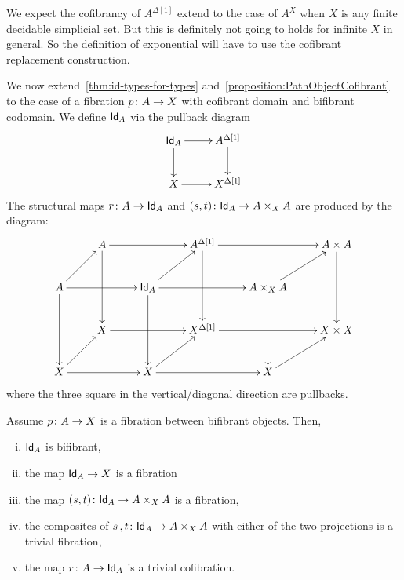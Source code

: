 \documentclass[reqno,10pt,a4paper,oneside,draft]{amsart}
\begin{document}
\begin{remark}
We expect the cofibrancy of $A^{\Delta[1]}$ extend to the case of $A^{X}$ when $X$ is any finite decidable simplicial set. But this is definitely not going to holds for infinite $X$ in general. So the definition of exponential will have to use the cofibrant replacement construction.
\end{remark} 


\bigskip


We now extend~\cref{thm:id-types-for-types} and~\cref{proposition:PathObjectCofibrant} 
to the case of a fibration $p \colon A \rightarrow X$ with cofibrant domain and bifibrant codomain. We define $\mathsf{Id}_A$ 
via the pullback diagram
\[
\xymatrix{
\Id_A \ar[r] \ar[d] & A^{\Delta[1]} \ar[d] \\
X \ar[r] & X^{\Delta[1]} \\
}
\]
The structural maps $r \colon A \rightarrow \mathsf{Id}_A$ and $(s, t) \colon \mathsf{Id}_A \rightarrow A \times_{X} A$ are produced by the diagram:
\[
\xymatrix{
& A \ar[rr] \ar[dd] & & A^{\Delta[1]} \ar[rr] \ar[dd] & & A \times A \ar[dd] \\
A \ar[ur] \ar[rr] \ar[dd] & & \Id_A \ar[ur] \ar[rr] \ar[dd] & & A \times_{X} A \ar[ur] \ar[dd] \\
& X \ar[rr] & & X^{\Delta[1]} \ar[rr] & & X \times X \\
X \ar[ur] \ar[rr] & & X \ar[rr] \ar[ur] & & X \ar[ur] \\ 
}
\]
where the three square in the vertical/diagonal direction are pullbacks.


\begin{proposition}
\label{proposition:MainPathObject}
Assume $p \colon A \rightarrow X $ is a fibration between bifibrant objects. Then,
\begin{enumerate}[(i)] 
\item $\mathsf{Id}_A$ is bifibrant, 
\item the map $\mathsf{Id}_A \rightarrow X$ is a fibration
\item the map $(s, t) \colon \mathsf{Id}_A \rightarrow A \times_{X} A$ is a fibration,
\item the composites of $s \, , t \colon \mathsf{Id}_A \rightarrow A \times_{X} A$  with either of the two projections is a trivial fibration,
\item the map $r \colon A \rightarrow \mathsf{Id}_A$ is a trivial cofibration.
\end{enumerate}
\end{proposition}
\end{document}
